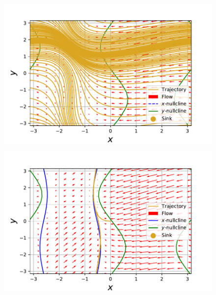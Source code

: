 \documentclass[../main]{subfiles}
\begin{document}
\begin{figure}[tbp]
\begin{minipage}[b]{0.47\linewidth}
      \includegraphics[keepaspectratio, scale=0.42]{images/phase_a4K22.pdf}
      \label{fig:phase-k22}
    \end{minipage}
    \begin{minipage}[b]{0.47\linewidth}
      \centering
      \includegraphics[keepaspectratio, scale=0.42]{images/phase_a4K50.pdf}
      \label{fig:phase-k50}
    \end{minipage}\\
    \begin{minipage}[b]{0.47\linewidth}
      \centering

\end{minipage}
\end{figure}
\end{document}
